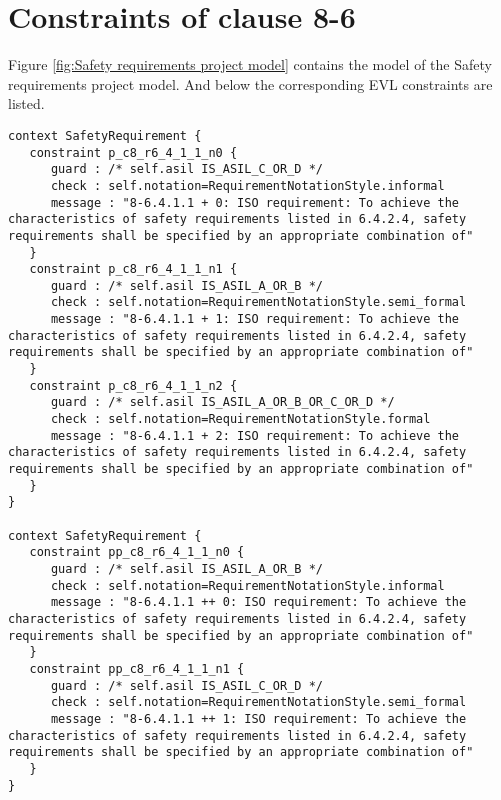 \documentclass[a4paper]{article}
\begin{document}
\section*{Constraints of clause 8-6}
Figure \ref{fig:Safety requirements project model} contains the model of the Safety requirements project model. And below the corresponding EVL constraints are listed.

\begin{lstlisting}
context SafetyRequirement {
   constraint p_c8_r6_4_1_1_n0 {
      guard : /* self.asil IS_ASIL_C_OR_D */
      check : self.notation=RequirementNotationStyle.informal
      message : "8-6.4.1.1 + 0: ISO requirement: To achieve the characteristics of safety requirements listed in 6.4.2.4, safety requirements shall be specified by an appropriate combination of"
   }
   constraint p_c8_r6_4_1_1_n1 {
      guard : /* self.asil IS_ASIL_A_OR_B */
      check : self.notation=RequirementNotationStyle.semi_formal
      message : "8-6.4.1.1 + 1: ISO requirement: To achieve the characteristics of safety requirements listed in 6.4.2.4, safety requirements shall be specified by an appropriate combination of"
   }
   constraint p_c8_r6_4_1_1_n2 {
      guard : /* self.asil IS_ASIL_A_OR_B_OR_C_OR_D */
      check : self.notation=RequirementNotationStyle.formal
      message : "8-6.4.1.1 + 2: ISO requirement: To achieve the characteristics of safety requirements listed in 6.4.2.4, safety requirements shall be specified by an appropriate combination of"
   }
}

context SafetyRequirement {
   constraint pp_c8_r6_4_1_1_n0 {
      guard : /* self.asil IS_ASIL_A_OR_B */
      check : self.notation=RequirementNotationStyle.informal
      message : "8-6.4.1.1 ++ 0: ISO requirement: To achieve the characteristics of safety requirements listed in 6.4.2.4, safety requirements shall be specified by an appropriate combination of"
   }
   constraint pp_c8_r6_4_1_1_n1 {
      guard : /* self.asil IS_ASIL_C_OR_D */
      check : self.notation=RequirementNotationStyle.semi_formal
      message : "8-6.4.1.1 ++ 1: ISO requirement: To achieve the characteristics of safety requirements listed in 6.4.2.4, safety requirements shall be specified by an appropriate combination of"
   }
}


\end{lstlisting}
\end{document}
